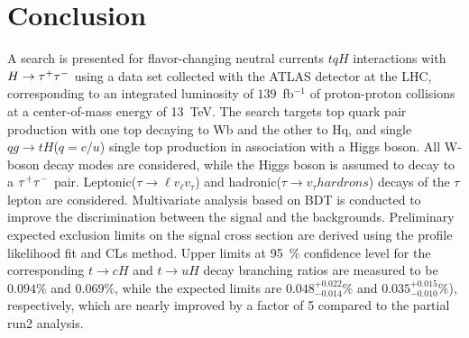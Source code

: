 \section{Conclusion}
\label{sec:conclusion}


A search is presented for flavor-changing neutral currents $tqH$ interactions with $H\to\tau^{+}\tau^{-}$ using a data set collected with the ATLAS
detector at the LHC, corresponding to an integrated luminosity of $139$~fb$^{-1}$ of proton-proton collisions at a center-of-mass energy of 13~TeV.
The search targets top quark pair production with one top decaying to Wb and the other to Hq, and single $qg \to tH$($q=c/u$) single top production in association with a Higgs boson. All W-boson decay modes are considered, while the Higgs boson is assumed to decay to a $\tau^{+}\tau^{-}$ pair. Leptonic($\tau \rightarrow \ell v_{\ell} v_{\tau}$) and hadronic($\tau \rightarrow v_{\tau} hardrons$) decays of the $\tau$ lepton are considered.
Multivariate analysis based on BDT is conducted to improve the discrimination between the signal and the backgrounds. Preliminary expected exclusion limits on the signal cross section are derived using the profile likelihood fit and CLs method. Upper limits at 95~\% confidence level for the corresponding $t\to cH$ and $t\to uH$ decay branching ratios are measured to be $0.094\%$ and $0.069\%$, while the expected limits are $0.048^{+0.022}_{-0.014}\%$ and $0.035^{+0.015}_{-0.010}\%$), respectively, which are nearly improved by a factor of 5 compared to the partial run2 analysis. 